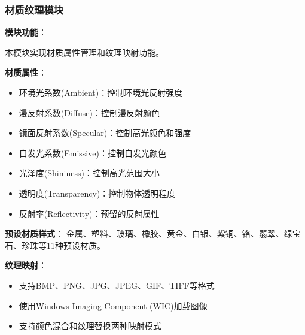 \documentclass[12pt,a4paper]{article}
\begin{document}
\begin{tcolorbox}
\subsubsection{材质纹理模块}

\textbf{模块功能}：

本模块实现材质属性管理和纹理映射功能。

\textbf{材质属性}：
\begin{itemize}
    \item 环境光系数(Ambient)：控制环境光反射强度
    \item 漫反射系数(Diffuse)：控制漫反射颜色
    \item 镜面反射系数(Specular)：控制高光颜色和强度
    \item 自发光系数(Emissive)：控制自发光颜色
    \item 光泽度(Shininess)：控制高光范围大小
    \item 透明度(Transparency)：控制物体透明程度
    \item 反射率(Reflectivity)：预留的反射属性
\end{itemize}

\textbf{预设材质样式}：
金属、塑料、玻璃、橡胶、黄金、白银、紫铜、铬、翡翠、绿宝石、珍珠等11种预设材质。

\textbf{纹理映射}：
\begin{itemize}
    \item 支持BMP、PNG、JPG、JPEG、GIF、TIFF等格式
    \item 使用Windows Imaging Component (WIC)加载图像
    \item 支持颜色混合和纹理替换两种映射模式
\end{itemize}
\end{tcolorbox}
\end{document}
